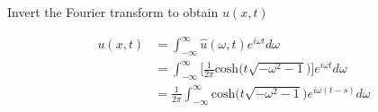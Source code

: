 \documentclass[12pt]{article}
\newenvironment{subproblem}[2][Part]{\begin{trivlist}
  \item[\hskip \labelsep {\bfseries #1}\hskip \labelsep {\bfseries (#2)}]}{\end{trivlist}}
\newenvironment{solution}[1][Solution]{\begin{trivlist}
  \item[\hskip \labelsep {\bfseries #1} \hskip \labelsep]}{\end{trivlist}}
\theoremstyle{remark}
\begin{document}
\begin{subproblem}{c}
  Invert the Fourier transform to obtain \(u(x,t)\)
\end{subproblem}
\begin{solution}
  \begin{align*}
    u(x,t) &= \int_{-\infty}^{\infty}\hat{u}(\omega,t)e^{i\omega t}d\omega \\
           &= \int_{-\infty}^{\infty}\bigg[\frac{1}{2\pi}\text{cosh}\big(t\sqrt{-\omega^2-1} \big)
             \bigg]e^{i\omega t}d\omega \\
           &= \frac{1}{2\pi}\int_{-\infty}^{\infty}\text{cosh}\big(t\sqrt{-\omega^2-1} \big)
             e^{i\omega (t-s)}d\omega \\ 
  \end{align*}
\end{solution} 
    
\end{document}

